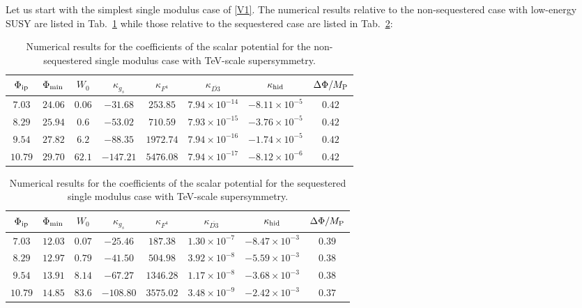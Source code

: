 \documentclass[12pt,a4paper]{book}
\begin{document}
Let us start with the simplest single modulus case of \eqref{V1}. The numerical results relative to the non-sequestered case with low-energy SUSY are listed in Tab.~\ref{tab3} while those relative to the sequestered case are listed in Tab.~\ref{tab4}:
\begin{table}[H]
\begin{center}
\begin{tabular}{cccccccc}
\hline
$\Phi_{\rm ip}$ & $\Phi_{\rm min}$ & $W_0$ & $\kappa_{g_s}$ & $\kappa_{F^4}$ & $\kappa_{\overline{D3}}$ & $\kappa_{\rm hid}$ & $\Delta \Phi/M_{\rm P}$ \\
\hline
$7.03$ & $24.06$ & $0.06$ & $-31.68$ & $253.85$ & $7.94 \times 10^{-14}$ & $-8.11 \times 10^{-5}$  & $0.42$\\
\hline
$8.29$ & $25.94$ & $0.6$ & $-53.02$ & $710.59$ & $7.93 \times 10^{-15}$ & $-3.76 \times 10^{-5}$ & $0.42$ \\
\hline
$9.54$ & $27.82$ & $6.2$ & $-88.35$ & $1972.74$ & $7.94 \times 10^{-16}$ & $-1.74 \times 10^{-5}$ & $0.42$ \\
\hline
$10.79$ & $29.70$ & $62.1$ & $-147.21$ & $5476.08$ & $7.94 \times 10^{-17}$ & $-8.12 \times 10^{-6}$ & $0.42$ \\
\hline
\end{tabular}
\end{center}
\caption{Numerical results for the coefficients of the scalar potential for the non-sequestered single modulus case with TeV-scale supersymmetry.}
\label{tab3}
\end{table}

\begin{table}[H]
\begin{center}
\begin{tabular}{cccccccc}
\hline
$\Phi_{\rm ip}$ & $\Phi_{\rm min}$ & $W_0$ & $\kappa_{g_s}$ & $\kappa_{F^4}$ & $\kappa_{\overline{D3}}$ & $\kappa_{\rm hid}$ & $\Delta \Phi/M_{\rm P}$ \\
\hline
$7.03$ & $12.03$ & $0.07$ & $-25.46$ & $187.38$ & $1.30 \times 10^{-7}$ & $-8.47 \times 10^{-3}$ & $0.39$ \\
\hline
$8.29$ & $12.97$ & $0.79$ & $-41.50$ & $504.98$ & $3.92 \times 10^{-8}$ & $-5.59 \times 10^{-3}$ & $0.38$ \\
\hline
$9.54$ & $13.91$ & $8.14$ & $-67.27$ & $1346.28$ & $1.17 \times 10^{-8}$ & $-3.68 \times 10^{-3}$ & $0.38$ \\
\hline
$10.79$ & $14.85$ & $83.6$ & $-108.80$ & $3575.02$ & $3.48 \times10^{-9}$ & $-2.42 \times 10^{-3}$ & $0.37$ \\
\hline
\end{tabular}
\end{center}
\caption{Numerical results for the coefficients of the scalar potential for the sequestered single modulus case with TeV-scale supersymmetry.}
\label{tab4}
\end{table}
\end{document}
